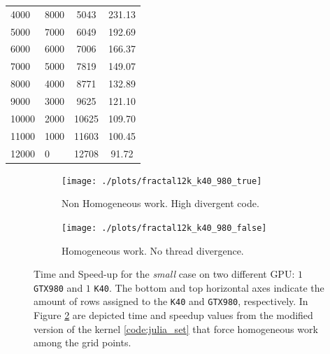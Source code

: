 \begin{table}[!htb]
\begin{subtable}{.5\linewidth}
\begin{tabular}{@{}LLCC@{}}
				4000  & 8000  & 5043  & 231.13 \\
				5000  & 7000  & 6049  & 192.69 \\
				6000  & 6000  & 7006  & 166.37 \\
				7000  & 5000  & 7819  & 149.07 \\
				8000  & 4000  & 8771  & 132.89 \\
				9000  & 3000  & 9625  & 121.10 \\
				10000 & 2000  & 10625 & 109.70 \\
				11000 & 1000  & 11603 & 100.45 \\
				12000 & 0     & 12708 & 91.72
				 \\ 
			\bottomrule
		\end{tabular}
	\end{subtable} 
\end{table}
 

 
 
 \begin{figure}
 	
 	\begin{subfigure}{1.0\textwidth}
 		\caption{Non Homogeneous work. High divergent code.}
 		\texttt{[image: ./plots/fractal12k\_k40\_980\_true]}
 		\label{fig:julia_two_GPU_true}
 		
 	\end{subfigure}		
 	\endminipage\hfill
 	\vspace{5mm}
 	\begin{subfigure}{1.0\textwidth}
 			\caption{Homogeneous work. No thread divergence.}
 		\texttt{[image: ./plots/fractal12k\_k40\_980\_false]}
 		\label{fig:julia_two_GPU_false}
 	
 	\end{subfigure}
 	\endminipage\hfill
	
 	\caption[Time and Speed-up for the \textit{small} case on two different GPU: $1$ \texttt{GTX980} and $1$ \texttt{K40}.]{Time and Speed-up for the \textit{small} case on two different GPU: $1$ \texttt{GTX980} and $1$ \texttt{K40}. The bottom and top horizontal axes indicate the amount of rows assigned to the \texttt{K40} and \texttt{GTX980}, respectively. In Figure \ref{fig:julia_two_GPU_false} are depicted time and speedup values from the modified version of the kernel \ref{code:julia_set} that force homogeneous work among the grid points.  }
 	\label{fig:julia_two_GPU}
 \end{figure}

